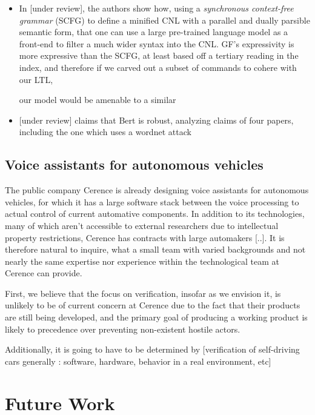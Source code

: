 \documentclass[a4paper, 11pt]{article}
\begin{document}
\begin{itemize}

\item In \cite{fewShotSem} [under review], the authors show how, using a \emph{synchronous
context-free grammar} (SCFG) to define a minified CNL with a parallel and dually
parsible semantic form, that one can use a large pre-trained language model as a front-end
to filter a much wider syntax into the CNL. GF's expressivity is
more expressive than the SCFG, at least based off a tertiary reading in the
index, and therefore if we carved out a subset of commands to cohere with our
LTL,

our model would be amenable to a similar

\item  \cite{hauser2021bert} [under review] claims that Bert is robust, analyzing claims of four
  papers, including the one which uses a wordnet attack

\end{itemize}

\subsection{Voice assistants for autonomous vehicles}

The public company Cerence \cite{} is already designing voice assistants for autonomous
vehicles, for which it has a large software stack between the voice processing
to actual control of current automative components. In addition to its 
technologies, many of which aren't accessible to external researchers due to
intellectual property restrictions, Cerence has contracts with large automakers
[..]. It is therefore natural to inquire, what a small team with varied
backgrounds and not nearly the same expertise nor experience within the
technological team at Cerence can provide.

First, we believe that the focus on verification, insofar as we envision it, is
unlikely to be of current concern at Cerence due to the fact that their products
are still being developed, and the primary goal of producing a working product
is likely to precedence over preventing non-existent hostile actors.

Additionally, it is going to have to be determined by 
[verification of self-driving cars generally : software, hardware, behavior in
a real environment, etc]



\section{Future Work}
\end{document}
